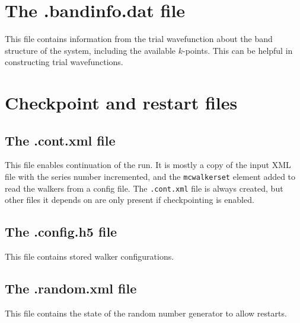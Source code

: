 \section{The .bandinfo.dat file}
\label{sec:bandinfo_file}
This file contains information from the trial wavefunction about the band structure of the system,
including the available $k$-points. This can
be helpful in constructing trial wavefunctions.


\section{Checkpoint and restart files}
\subsection{The .cont.xml file}
This file enables continuation of the run.  It is mostly a copy of the input XML file with the series number incremented, and the \texttt{mcwalkerset} element added to read the walkers from a config file.   The \texttt{.cont.xml} file is always created, but other files it depends on are only present if checkpointing is enabled.

\subsection{The .config.h5 file}
This file contains stored walker configurations.

\subsection{The .random.xml file}
This file contains the state of the random number generator to allow restarts.

